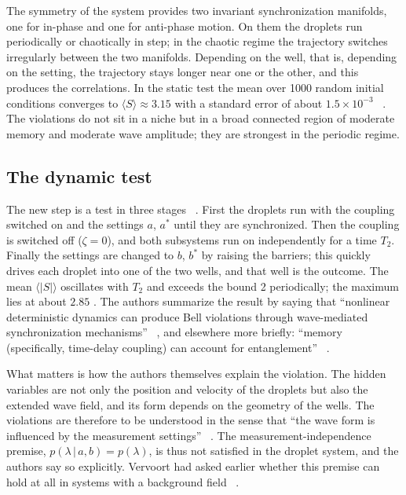 The symmetry of the system provides two invariant synchronization manifolds, one for in-phase and one
for anti-phase motion. On them the droplets run periodically or chaotically in step; in the chaotic
regime the trajectory switches irregularly between the two manifolds. Depending on the well, that is,
depending on the setting, the trajectory stays longer near one or the other, and this produces the
correlations. In the static test the mean over 1000 random initial conditions converges to
$\langle S\rangle\approx3.15$ with a standard error of about $1.5\times10^{-3}$
\QM~\cite{Lopez2026}. The violations do not sit in a niche but in a broad connected region of
moderate memory and moderate wave amplitude; they are strongest in the periodic regime.

\subsection{The dynamic test}

The new step is a test in three stages \QM~\cite{Lopez2026}. First the droplets run with the coupling
switched on and the settings $a$, $a^*$ until they are synchronized. Then the coupling is switched
off ($\zeta=0$), and both subsystems run on independently for a time $T_2$. Finally the settings are
changed to $b$, $b^*$ by raising the barriers; this quickly drives each droplet into one of the two
wells, and that well is the outcome. The mean $\langle|S|\rangle$ oscillates with $T_2$ and exceeds
the bound 2 periodically; the maximum lies at about $2.85$ \QM. The authors summarize the result by
saying that \enquote{nonlinear deterministic dynamics can produce Bell violations through
wave-mediated synchronization mechanisms} \QM~\cite{Lopez2026}, and elsewhere more briefly:
\enquote{memory (specifically, time-delay coupling) can account for entanglement}
\QM~\cite{Lopez2026}.

What matters is how the authors themselves explain the violation. The hidden variables are not only
the position and velocity of the droplets but also the extended wave field, and its form depends on
the geometry of the wells. The violations are therefore to be understood in the sense that
\enquote{the wave form is influenced by the measurement settings} \QM~\cite{Lopez2026}. The
measurement-independence premise, $p(\lambda\,|\,a,b)=p(\lambda)$, is thus not satisfied in the
droplet system, and the authors say so explicitly. Vervoort had asked earlier whether this premise
can hold at all in systems with a background field \QM~\cite{Vervoort2018}.

